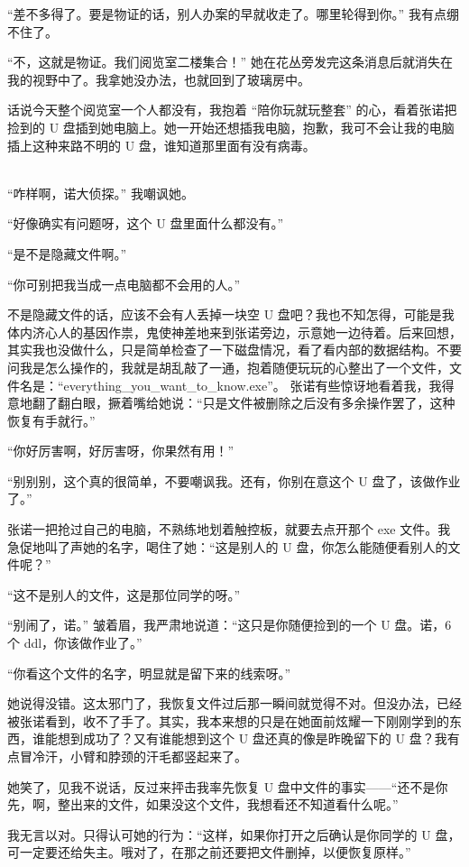 \documentclass[UTF8]{ctexart}
\begin{document}
“差不多得了。要是物证的话，别人办案的早就收走了。哪里轮得到你。” 我有点绷不住了。

“不，这就是物证。我们阅览室二楼集合！” 她在花丛旁发完这条消息后就消失在我的视野中了。我拿她没办法，也就回到了玻璃房中。

话说今天整个阅览室一个人都没有，我抱着 “陪你玩就玩整套” 的心，看着张诺把捡到的 U 盘插到她电脑上。她一开始还想插我电脑，抱歉，我可不会让我的电脑插上这种来路不明的 U 盘，谁知道那里面有没有病毒。

~\\

“咋样啊，诺大侦探。” 我嘲讽她。

“好像确实有问题呀，这个 U 盘里面什么都没有。”

“是不是隐藏文件啊。”

“你可别把我当成一点电脑都不会用的人。”

不是隐藏文件的话，应该不会有人丢掉一块空 U 盘吧？我也不知怎得，可能是我体内济心人的基因作祟，鬼使神差地来到张诺旁边，示意她一边待着。后来回想，其实我也没做什么，只是简单检查了一下磁盘情况，看了看内部的数据结构。不要问我是怎么操作的，我就是胡乱敲了一通，抱着随便玩玩的心整出了一个文件，文件名是：“everything\_you\_want\_to\_know.exe”。
张诺有些惊讶地看着我，我得意地翻了翻白眼，撅着嘴给她说：“只是文件被删除之后没有多余操作罢了，这种恢复有手就行。”

“你好厉害啊，好厉害呀，你果然有用！”

“别别别，这个真的很简单，不要嘲讽我。还有，你别在意这个 U 盘了，该做作业了。”

张诺一把抢过自己的电脑，不熟练地划着触控板，就要去点开那个 exe 文件。我急促地叫了声她的名字，喝住了她：“这是别人的 U 盘，你怎么能随便看别人的文件呢？”

“这不是别人的文件，这是那位同学的呀。”

“别闹了，诺。” 皱着眉，我严肃地说道：“这只是你随便捡到的一个 U 盘。诺，6 个 ddl，你该做作业了。”

“你看这个文件的名字，明显就是留下来的线索呀。”

她说得没错。这太邪门了，我恢复文件过后那一瞬间就觉得不对。但没办法，已经被张诺看到，收不了手了。其实，我本来想的只是在她面前炫耀一下刚刚学到的东西，谁能想到成功了？又有谁能想到这个 U 盘还真的像是昨晚留下的 U 盘？我有点冒冷汗，小臂和脖颈的汗毛都竖起来了。

她笑了，见我不说话，反过来抨击我率先恢复 U 盘中文件的事实——“还不是你先，啊，整出来的文件，如果没这个文件，我想看还不知道看什么呢。”

我无言以对。只得认可她的行为：“这样，如果你打开之后确认是你同学的 U 盘，可一定要还给失主。哦对了，在那之前还要把文件删掉，以便恢复原样。”
\end{document}
